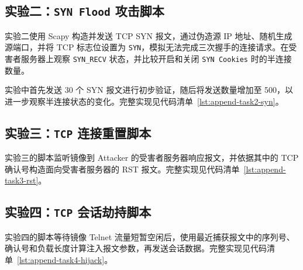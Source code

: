 
\subsection{实验二：\texttt{SYN Flood} 攻击脚本}

实验二使用 Scapy 构造并发送 TCP SYN 报文，通过伪造源 IP 地址、随机生成源端口，并将 TCP 标志位设置为 \texttt{SYN}，模拟无法完成三次握手的连接请求。在受害者服务器上观察 \texttt{SYN\_RECV} 状态，并比较开启和关闭 \texttt{SYN Cookies} 时的半连接数量。

实验中首先发送 30 个 SYN 报文进行初步验证，随后将发送数量增加至 500，以进一步观察半连接状态的变化。完整实现见代码清单~\ref{lst:append-task2-syn}。



\subsection{实验三：\texttt{TCP} 连接重置脚本}

实验三的脚本监听镜像到 Attacker 的受害者服务器响应报文，并依据其中的 TCP 确认号构造面向受害者服务器的 RST 报文。完整实现见代码清单~\ref{lst:append-task3-rst}。



\subsection{实验四：\texttt{TCP} 会话劫持脚本}

实验四的脚本等待镜像 Telnet 流量短暂空闲后，使用最近捕获报文中的序列号、确认号和负载长度计算注入报文参数，再发送会话数据。完整实现见代码清单~\ref{lst:append-task4-hijack}。


